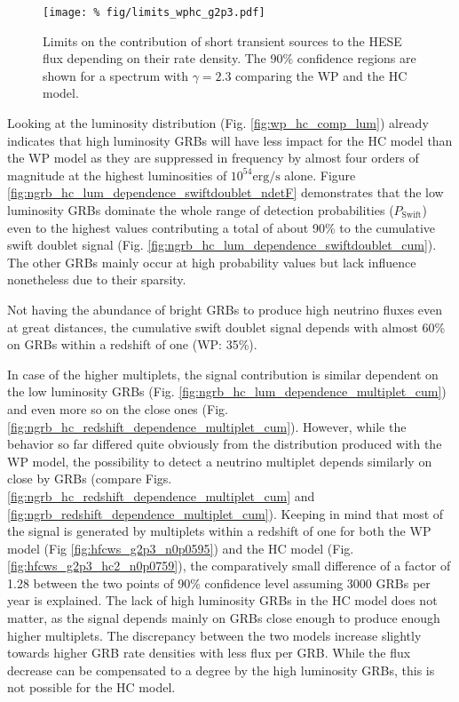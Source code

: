 \begin{figure}[h]
\centering
 \captionsetup{width=.9\textwidth}
\texttt{[image: \%
fig/limits\_wphc\_g2p3.pdf]}
\caption{Limits on the contribution of short transient sources to the HESE 
flux depending on their rate density. The 90\% confidence regions are shown for 
a spectrum with $\gamma=2.3$ comparing the WP and the HC model.}
\label{fig:limits_wphc_g2p3}
\end{figure}

Looking at the luminosity distribution (Fig. \ref{fig:wp_hc_comp_lum}) already 
indicates that high luminosity GRBs will have less impact for the HC model than 
the WP model as they are suppressed in frequency by almost four orders of 
magnitude at the highest luminosities of $10^{54}\mathrm{erg/s}$ alone. Figure 
\ref{fig:ngrb_hc_lum_dependence_swiftdoublet_ndetF} demonstrates that the low 
luminosity GRBs dominate the whole range of detection probabilities 
($P_\mathrm{Swift}$) even to the highest values contributing a total of about 
90\% to the cumulative swift doublet signal (Fig. 
\ref{fig:ngrb_hc_lum_dependence_swiftdoublet_cum}). The other GRBs mainly occur 
at high probability values but lack influence nonetheless due to their 
sparsity. 

Not having the abundance of bright GRBs to produce high neutrino fluxes even at 
great distances, the cumulative swift doublet signal depends with almost 60\%  
on GRBs within a redshift of one (WP: 35\%).  %

In case of the higher multiplets, the signal contribution is similar dependent 
on the low luminosity GRBs (Fig. 
\ref{fig:ngrb_hc_lum_dependence_multiplet_cum}) and even more so on the close 
ones (Fig. \ref{fig:ngrb_hc_redshift_dependence_multiplet_cum}). However, while 
 the behavior so far differed quite obviously from the distribution produced 
with the WP model, the possibility to detect a 
neutrino multiplet depends similarly on close by GRBs (compare Figs. 
\ref{fig:ngrb_hc_redshift_dependence_multiplet_cum} and 
\ref{fig:ngrb_redshift_dependence_multiplet_cum}). Keeping in mind that most of 
the signal is generated by multiplets within a redshift of one for both the WP 
model (Fig \ref{fig:hfcws_g2p3_n0p0595}) and the HC model (Fig. 
\ref{fig:hfcws_g2p3_hc2_n0p0759}), the comparatively small difference of a 
factor of 1.28 between the two points of 90\% confidence level assuming 3000 
GRBs per year is explained. The lack of high luminosity GRBs in the HC model 
does not matter, as the signal depends mainly on GRBs close enough to produce 
enough higher multiplets.
The discrepancy between the two models increase slightly towards higher GRB 
rate densities with less flux per GRB. While the flux decrease can be 
compensated to a degree by the high luminosity GRBs, this is not possible for 
the HC model.

